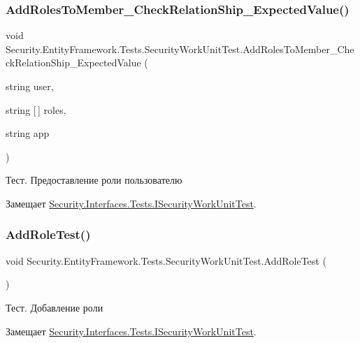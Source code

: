 \subsubsection{\texorpdfstring{Add\+Roles\+To\+Member\+\_\+\+Check\+Relation\+Ship\+\_\+\+Expected\+Value()}{AddRolesToMember\_CheckRelationShip\_ExpectedValue()}}
{\footnotesize\ttfamily void Security.\+Entity\+Framework.\+Tests.\+Security\+Work\+Unit\+Test.\+Add\+Roles\+To\+Member\+\_\+\+Check\+Relation\+Ship\+\_\+\+Expected\+Value (\begin{DoxyParamCaption}\item[{string}]{user,  }\item[{string \mbox{[}$\,$\mbox{]}}]{roles,  }\item[{string}]{app }\end{DoxyParamCaption})}



Тест. Предоставление роли пользователю 



Замещает \hyperlink{interface_security_1_1_interfaces_1_1_tests_1_1_i_security_work_unit_test_a8b688153cfd3d37c56eb5e6dc888e36d}{Security.\+Interfaces.\+Tests.\+I\+Security\+Work\+Unit\+Test}.

\mbox{\label{class_security_1_1_entity_framework_1_1_tests_1_1_security_work_unit_test_a2e5d88021b10b11d71615bbe0eb3b294}} 
\subsubsection{\texorpdfstring{Add\+Role\+Test()}{AddRoleTest()}}
{\footnotesize\ttfamily void Security.\+Entity\+Framework.\+Tests.\+Security\+Work\+Unit\+Test.\+Add\+Role\+Test (\begin{DoxyParamCaption}{ }\end{DoxyParamCaption})}



Тест. Добавление роли 



Замещает \hyperlink{interface_security_1_1_interfaces_1_1_tests_1_1_i_security_work_unit_test_a1adebc2d3ec0cb84ea2bf16dd50cb05e}{Security.\+Interfaces.\+Tests.\+I\+Security\+Work\+Unit\+Test}.

